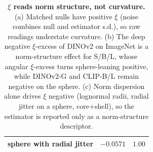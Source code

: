 \begin{table}[H]
\begin{tabular}{lcc}
sphere with radial jitter & $-0.0571$ & $1.00$ \\
\bottomrule
\end{tabular}
\par\vspace{5pt}
\caption{\textbf{$\xi$ reads norm structure, not curvature.} (a) Matched nulls have positive $\xi$ (noise combines null and estimator s.d.), so raw readings understate curvature. (b) The deep negative $\xi$-excess of DINOv2 on ImageNet is a norm-structure effect for S/B/L, whose angular $\xi$-excess turns sphere-leaning positive, while DINOv2-G and CLIP-B/L remain negative on the sphere. (c) Norm dispersion alone drives $\xi$ negative (lognormal radii, radial jitter on a sphere, core+shell), so the estimator is reported only as a norm-structure descriptor. %
}
\label{tab:q12-xi}
\end{table}
